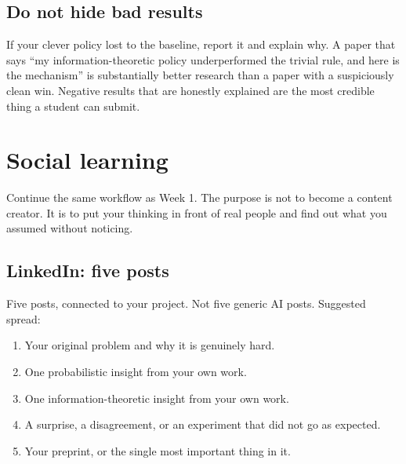 \documentclass[11pt,a4paper]{article}
\begin{document}
\subsection{Do not hide bad results}

If your clever policy lost to the baseline, report it and explain why. A paper that says ``my
information-theoretic policy underperformed the trivial rule, and here is the mechanism'' is
substantially better research than a paper with a suspiciously clean win. Negative results that
are honestly explained are the most credible thing a student can submit.

\section{Social learning}
\label{sec:social}

Continue the same workflow as Week 1. The purpose is not to become a content creator. It is to
put your thinking in front of real people and find out what you assumed without noticing.

\subsection{LinkedIn: five posts}

Five posts, connected to your project. Not five generic AI posts. Suggested spread:

\begin{enumerate}
  \item Your original problem and why it is genuinely hard.
  \item One probabilistic insight from your own work.
  \item One information-theoretic insight from your own work.
  \item A surprise, a disagreement, or an experiment that did not go as expected.
  \item Your preprint, or the single most important thing in it.
\end{enumerate}
\end{document}
